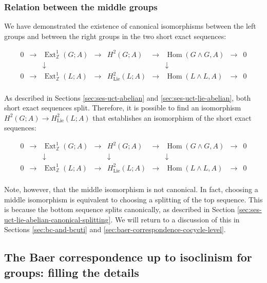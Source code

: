 \documentclass{ucetd}
\begin{document}
\subsubsection{Relation between the middle groups}\label{sec:bcuti-extensions-splitting}

We have demonstrated the existence of canonical isomorphisms between
the left groups and between the right groups in the two short exact
sequences:

$$\begin{array}{ccccccccc}
  0 &\to &\operatorname{Ext}^1_{\mathbb{Z}}(G;A) &\to &H^2(G;A) &\to &\operatorname{Hom}(G \wedge G,A) &\to &0\\
  & & \downarrow & & & & \downarrow & & \\
  0 &\to &\operatorname{Ext}^1_{\mathbb{Z}}(L;A) & \to & H^2_{\text{Lie}}(L;A) & \to & \operatorname{Hom}(L \wedge L, A) & \to & 0\\
\end{array}$$

As described in Sections \ref{sec:ses-uct-abelian} and
\ref{sec:ses-uct-lie-abelian}, both short exact sequences
split. Therefore, it is possible to find an isomorphism $H^2(G;A) \to
H^2_{\text{Lie}}(L;A)$ that establishes an isomorphism of the short
exact sequences:

$$\begin{array}{ccccccccc}
  0 &\to &\operatorname{Ext}^1_{\mathbb{Z}}(G;A) &\to &H^2(G;A) &\to &\operatorname{Hom}(G \wedge G,A) &\to &0\\
  & & \downarrow & & \downarrow & & \downarrow & & \\
  0 &\to &\operatorname{Ext}^1_{\mathbb{Z}}(L;A) & \to & H^2_{\text{Lie}}(L;A) & \to & \operatorname{Hom}(L \wedge L, A) & \to & 0\\
\end{array}$$

Note, however, that the middle isomorphism is not canonical. In fact,
choosing a middle isomorphism is equivalent to choosing a splitting of
the top sequence. This is because the bottom sequence splits
canonically, as described in Section
\ref{sec:ses-uct-lie-abelian-canonical-splitting}.  We will return to
a discussion of this in Sections \ref{sec:bc-and-bcuti} and
\ref{sec:baer-correspondence-cocycle-level}.

\subsection{The Baer correspondence up to isoclinism for groups: filling the details}
\end{document}
